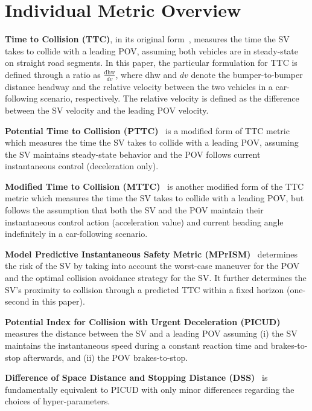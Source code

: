 \documentclass[journal]{IEEEtran}
\begin{document}
\section{Individual Metric Overview}\label{apx:constructive_da:overview} 

\textbf{Time to Collision (TTC)}, in its original form~\cite{hayward1972near}, measures the time the SV takes to collide with a leading POV, assuming both vehicles are in steady-state on straight road segments. In this paper, the particular formulation for TTC is defined through a ratio as $\frac{\text{dhw}}{dv}$, where dhw and $dv$ denote the bumper-to-bumper distance headway and the relative velocity between the two vehicles in a car-following scenario, respectively. The relative velocity is defined as the difference between the SV velocity and the leading POV velocity.

\textbf{Potential Time to Collision (PTTC)}~\cite{wakabayashi2003traffic} is a modified form of TTC metric which measures the time the SV takes to collide with a leading POV, assuming the SV maintains steady-state behavior and the POV follows current instantaneous control (deceleration only). 

\textbf{Modified Time to Collision (MTTC)}~\cite{Ozbay2008Derivation} is another modified form of the TTC metric which measures the time the SV takes to collide with a leading POV, but follows the assumption that both the SV and the POV maintain their instantaneous control action (acceleration value) and current heading angle indefinitely in a car-following scenario.

\textbf{Model Predictive Instantaneous Safety Metric (MPrISM)}~\cite{weng2020model} determines the risk of the SV by taking into account the worst-case maneuver for the POV and the optimal collision avoidance strategy for the SV. It further determines the SV's proximity to collision through a predicted TTC within a fixed horizon (one-second in this paper).

\textbf{Potential Index for Collision with Urgent Deceleration (PICUD)}~\cite{uno2002microscopic} measures the distance between the SV and a leading POV assuming (i) the SV maintains the instantaneous speed during a constant reaction time and brakes-to-stop afterwards, and (ii) the POV brakes-to-stop.

\textbf{Difference of Space Distance and Stopping Distance (DSS)}~\cite{okamura2011impact} is fundamentally equivalent to PICUD with only minor differences regarding the choices of hyper-parameters.
\end{document}
